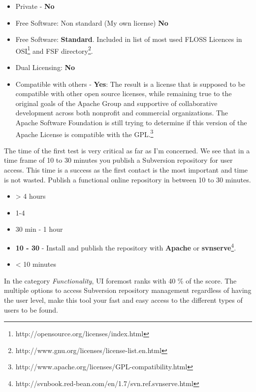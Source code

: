 \documentclass[11pt]{scrartcl}
\begin{document}
\begin{itemize} 
    \item Private - \textbf{No}
    \item Free Software: Non standard (My own license) \textbf{No}
    \item Free Software: \textbf{Standard}. Included in list of most used FLOSS Licences in OSI\footnote{http://opensource.org/licenses/index.html} and FSF directory\footnote{http://www.gnu.org/licenses/license-list.en.html}.
    \item Dual Licensing: \textbf{No}
    \item Compatible with others - \textbf{Yes}: The result is a license that is supposed to be compatible with other open source licenses, while remaining true to the original goals of the Apache Group and supportive of collaborative development across both nonprofit and commercial organizations. The Apache Software Foundation is still trying to determine if this version of the Apache License is compatible with the GPL.\footnote{http://www.apache.org/licenses/GPL-compatibility.html}
\end{itemize}

\par The time of the first test is very critical as far as I'm concerned. We see that in a time frame of 10 to 30 minutes you publish a Subversion repository for user access. This time is a success as the first contact is the most important and time is not wasted. Publish a functional online repository in between 10 to 30 minutes.

\begin{itemize}
    \item \textgreater
4 hours
    \item 1-4 
    \item 30 min - 1 hour
    \item \textbf{10 - 30} - Install and publish the repository with \textbf{Apache} or \textbf{svnserve}\footnote{http://svnbook.red-bean.com/en/1.7/svn.ref.svnserve.html}.
    \item \textless
10 minutes
\end{itemize}

\par In the category \emph{Functionality}, UI foremost ranks with 40 \% of the score. The multiple options to access Subversion repository management regardless of having the user level, make this tool your fast and easy access to the different types of users to be found.
\end{document}
